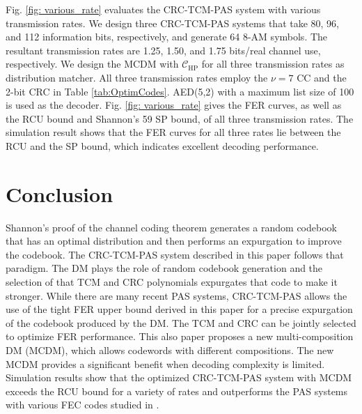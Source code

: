 \documentclass [PhD] {uclathes}
\begin{document}
Fig. \ref{fig: various_rate} evaluates the CRC-TCM-PAS system with various transmission rates. We design three CRC-TCM-PAS systems that take 80, 96, and 112 information bits, respectively, and generate 64 8-AM symbols. The resultant transmission rates are 1.25, 1.50, and 1.75 bits/real channel use, respectively. We design the MCDM with $\mathcal{C}_{\text{HP}}$ for all three transmission rates as distribution matcher. All three transmission rates employ the $\nu=7$ CC and the 2-bit CRC in Table \ref{tab:OptimCodes}. AED(5,2) with a maximum list size of 100 is used as the decoder.
Fig. \ref{fig: various_rate} gives the FER curves, as well as the RCU bound and Shannon's 59 SP bound, of all three transmission rates. The simulation result shows that the FER curves for all three rates lie between the RCU and the SP bound, which indicates excellent decoding performance.

\section{Conclusion}\label{sec: conclusion_3}
Shannon's proof of the channel coding theorem \cite{shannon1948mathematical} generates a random codebook that has an optimal distribution and then performs an expurgation to improve the codebook.  The CRC-TCM-PAS system described in this paper follows that paradigm.  The DM plays the role of random codebook generation and the selection of that TCM and CRC polynomials expurgates that code to make it stronger. While there are many recent PAS systems, CRC-TCM-PAS allows the use of the tight FER upper bound derived in this paper for a precise expurgation of the codebook produced by the DM.  The TCM and CRC can be jointly selected to optimize FER performance.  This also paper proposes a new multi-composition DM (MCDM), which allows codewords with different compositions.  The new MCDM provides a significant benefit when decoding complexity is limited.
Simulation results show that the optimized CRC-TCM-PAS system with MCDM exceeds the RCU bound for a variety of rates and outperforms the PAS systems with various FEC codes studied in \cite{cocskun2019efficient}.
\end{document}

